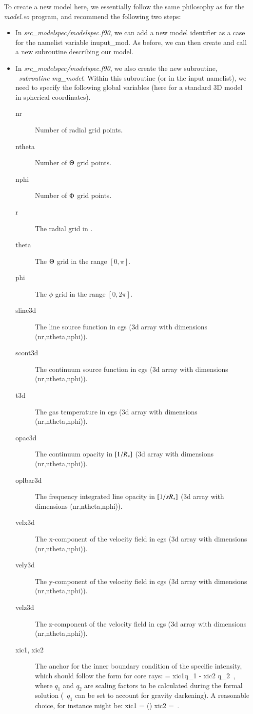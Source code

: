 \documentclass[10pt,a4paper]{article}
\begin{document}
To create a new model here, we essentially follow the same philosophy
as for the \textit{model.eo} program, and recommend the following two steps:
\begin{itemize}
\item In \textit{src\_modelspec/modelspec.f90}, we can add a new model identifier as a case for the namelist variable inuput\_mod.
  As before, we can then create and call a new subroutine describing our model.
  \item In \textit{src\_modelspec/modelspec.f90}, we also create the
    new subroutine, \eg~\textit{subroutine my\_model}. Within this
    subroutine (or in the input namelist), we need to specify the following global variables (here for a
    standard 3D model in spherical coordinates).
    \begin{description}
    \item[nr] Number of radial grid points.
    \item[ntheta] Number of $\Theta$ grid points.
    \item[nphi] Number of $\Phi$ grid points.
    \item[r] The radial grid in \Rstar.
    \item[theta] The $\Theta$ grid in the range $[0,\pi]$.
    \item[phi] The $\phi$ grid in the range $[0,2\pi]$.
    \item[sline3d] The line source function in cgs (3d array with dimensions (nr,ntheta,nphi)).
    \item[scont3d] The continuum source function in cgs (3d array with dimensions (nr,ntheta,nphi)).
    \item[t3d] The gas temperature in cgs (3d array with dimensions (nr,ntheta,nphi)).
    \item[opac3d] The continuum opacity in $[1/R_{\ast}]$ (3d array with dimensions (nr,ntheta,nphi)).
    \item[oplbar3d] The frequency integrated line opacity in $[1/sR_{\ast}]$ (3d array with dimensions (nr,ntheta,nphi)).
    \item[velx3d] The x-component of the velocity field in cgs (3d array with dimensions (nr,ntheta,nphi)).
    \item[vely3d] The y-component of the velocity field in cgs (3d array with dimensions (nr,ntheta,nphi)).
    \item[velz3d] The z-component of the velocity field in cgs (3d array with dimensions (nr,ntheta,nphi)).
    \item[xic1, xic2] The anchor for the inner boundary condition of the specific intensity, which should follow the form for core rays:
      \beq
      \Inu = xic1\cdot q_1 - xic2 \cdot q_2 \,,
      \eeq
      where $q_1$ and $q_2$ are scaling factors to be calculated during the formal solution (\eg~$q_1$ can be set to account for gravity darkening). A reasonable choice, for instance might be:
      \beq
      xic1 = \Bnu\left(\Teff\right) \qquad \qquad xic2 =  \,.
      \eeq
      \end{description}
  \end{itemize}
\end{document}
